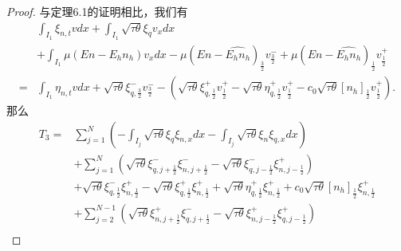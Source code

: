 \begin{proof}
    与定理6.1的证明相比，我们有
    $$
        \begin{aligned}
              & \int_{I_{1}} \xi_{n, t} v d x+\int_{I_{1}} \sqrt{\tau \theta} \xi_{q} v_{x} d x                                                                                                                                                                                                                                             \\
              & +\int_{I_{1}} \mu\left(E n-E_{h} n_{h}\right) v_{x} d x-\mu\left(E n-\widehat{E_{h} n_{h}}\right)_{\frac{3}{2}} v_{\frac{3}{2}}^{-}+\mu\left(E n-\widehat{E_{h} n_{h}}\right)_{\frac{1}{2}} v_{\frac{1}{2}}^{+}                                                                                                             \\
            = & \int_{I_{1}} \eta_{n, t} v d x+\sqrt{\tau \theta} \xi_{q, \frac{3}{2}}^{-} v_{\frac{3}{2}}^{-}-\left(\sqrt{\tau \theta} \xi_{q, \frac{1}{2}}^{+} v_{\frac{1}{2}}^{+}-\sqrt{\tau \theta} \eta_{q, \frac{1}{2}}^{+} v_{\frac{1}{2}}^{+}-c_{0} \sqrt{\tau \theta}\left[n_{h}\right]_{\frac{1}{2}} v_{\frac{1}{2}}^{+}\right) .
        \end{aligned}
    $$
    那么
    $$
        \begin{aligned}
            T_{3}= & \sum_{j=1}^{N}\left(-\int_{I_{j}} \sqrt{\tau \theta} \xi_{q} \xi_{n, x} d x-\int_{I_{j}} \sqrt{\tau \theta} \xi_{n} \xi_{q, x} d x\right)                                                                                                                                                          \\
                   & +\sum_{j=1}^{N}\left(\sqrt{\tau \theta} \xi_{q, j+\frac{1}{2}}^{-} \xi_{n, j+\frac{1}{2}}^{-}-\sqrt{\tau \theta} \xi_{q, j-\frac{1}{2}}^{-} \xi_{n, j-\frac{1}{2}}^{+}\right)                                                                                                                      \\
                   & +\sqrt{\tau \theta} \xi_{q, \frac{1}{2}}^{-} \xi_{n, \frac{1}{2}}^{+}-\sqrt{\tau \theta} \xi_{q, \frac{1}{2}}^{+} \xi_{n, \frac{1}{2}}^{+}+\sqrt{\tau \theta} \eta_{q, \frac{1}{2}}^{+} \xi_{n, \frac{1}{2}}^{+}+c_{0} \sqrt{\tau \theta}\left[n_{h}\right]_{\frac{1}{2}} \xi_{n, \frac{1}{2}}^{+} \\
                   & +\sum_{j=2}^{N-1}\left(\sqrt{\tau \theta} \xi_{n, j+\frac{1}{2}}^{+} \xi_{q, j+\frac{1}{2}}^{-}-\sqrt{\tau \theta} \xi_{n, j-\frac{1}{2}}^{+} \xi_{q, j-\frac{1}{2}}^{+}\right)                                                                                                                    \\

\end{aligned}$$
\end{proof}
